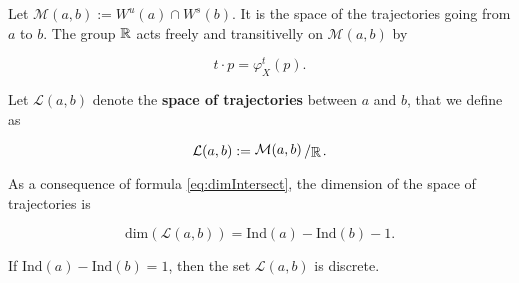 Let $\mathcal{M}(a,b) := W^u(a) \cap W^s(b)$. It is the space of the trajectories going from $a$ to $b$. The group $\mathbb{R}$ acts freely and transitivelly on $\mathcal{M}(a,b)$ by

\begin{displaymath}
t \cdot p = \varphi_X^t(p) .
\end{displaymath}

\begin{deff}
Let $\mathcal{L}(a,b)$ denote the {\bf space of trajectories} between $a$ and $b$, that we define as

\begin{displaymath}
\mathcal{L}(a,b) := \quocient{\mathcal{M}(a,b)}{\R} .
\end{displaymath}
\end{deff}

\begin{rmrk}
As a consequence of formula \ref{eq:dimIntersect}, the dimension of the space of trajectories is

\begin{displaymath}
\text{dim}(\mathcal{L}(a,b)) = \text{Ind}(a) - \text{Ind}(b) - 1 .
\end{displaymath}
\end{rmrk}

\begin{coro}
If $\text{Ind}(a)-\text{Ind}(b) = 1$, then the set $\mathcal{L}(a,b)$ is discrete.
\end{coro}
